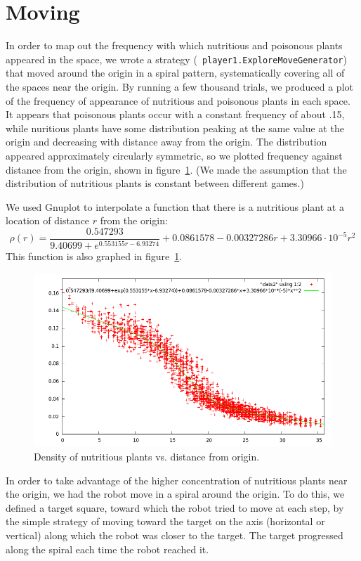 \documentclass{article}
\begin{document}
\section{Moving}
\label{sec:moving}
In order to map out the frequency with which nutritious and poisonous
plants appeared in the space, we wrote a strategy ({\tt
  player1.ExploreMoveGenerator}) that moved around the origin in a
spiral pattern, systematically covering all of the spaces near the
origin. By running a few thousand trials, we produced a plot of the
frequency of appearance of nutritious and poisonous plants in each
space. It appears that poisonous plants occur with a constant
frequency of about .15, while nuritious plants have some distribution
peaking at the same value at the origin and decreasing with distance
away from the origin. The distribution appeared approximately
circularly symmetric, so we plotted frequency against distance from
the origin, shown in figure~\ref{fig:plant_freq}. (We made the
assumption that the distribution of nutritious plants is constant
between different games.)

We used Gnuplot to interpolate a function that there is a nutritious
plant at a location of distance $r$ from the origin:
\[\rho(r)=\frac{0.547293}{9.40699+e^{0.553155r-6.93274}}+0.0861578-0.00327286r+3.30966\cdot10^{-5}r^2\]
This function is also graphed in figure~\ref{fig:plant_freq}.

\begin{figure}[h]
  \includegraphics[width=\columnwidth]{nutritiousmodel.png}
  \caption{Density of nutritious plants vs. distance from origin.}
  \label{fig:plant_freq}
\end{figure}

In order to take advantage of the higher concentration of nutritious
plants near the origin, we had the robot move in a spiral around the
origin. To do this, we defined a target square, toward which the robot
tried to move at each step, by the simple strategy of moving toward
the target on the axis (horizontal or vertical) along which the robot
was closer to the target. The target progressed along the spiral each
time the robot reached it.
\end{document}

